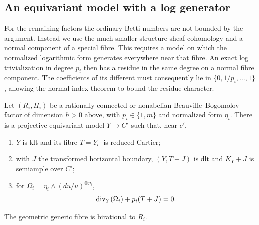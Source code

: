 \subsection{An equivariant model with a log generator}

For the remaining factors the ordinary Betti numbers are not bounded
by the argument. Instead we use the much smaller structure-sheaf
cohomology and a normal component of a special fibre. This requires
a model on which the normalized logarithmic form generates everywhere
near that fibre.
An exact log trivialization in degree $p_i$ then has a residue in the
same degree on a normal fibre component. The coefficients of its
different must consequently lie in $\{0,1/p_i,\ldots,1\}$, allowing
the normal index theorem to bound the residue character.

\begin{lemma}\label{lem:equivariant-good}
Let $(R_i,H_i)$ be a rationally connected or nonabelian
Beauville--Bogomolov factor of dimension $h>0$ above, with
$p_i\in\{1,m\}$ and normalized form $\eta_i$.
There is a projective equivariant model $Y\to C'$ such that, near $c'$,
\begin{enumerate}
\item $Y$ is klt and its fibre $T=Y_{c'}$ is reduced Cartier;
\item with $J$ the transformed horizontal boundary,
      $(Y,T+J)$ is dlt and $K_Y+J$ is semiample over $C'$;
\item for $\Omega_i=\eta_i\wedge(du/u)^{\otimes p_i}$,
\begin{equation}\label{eq:log-generator}
                     \operatorname{div}_Y(\Omega_i)+p_i(T+J)=0.
\end{equation}
\end{enumerate}
The geometric generic fibre is birational to $R_i$.
\end{lemma}

